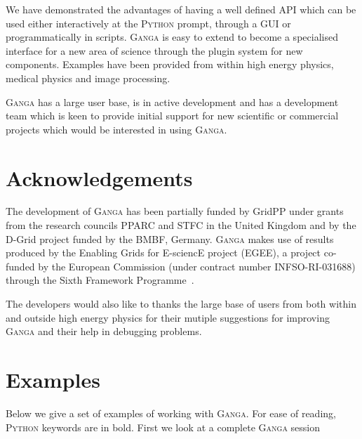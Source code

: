 \documentclass{elsart}
\def\ganga {\textsc{Ganga}\xspace}
\def\python {\textsc{Python}\xspace}
\begin{document}
We have demonstrated the advantages of having a well defined API which can be
used either interactively at the \python prompt, through a GUI or
programmatically in scripts. \ganga is easy to extend to become a specialised
interface for a new area of science through the plugin system for new
components. Examples have been provided  from within high
energy physics, medical physics and image processing.

\ganga has a large user base, is in active development and has a development
team which is keen to provide initial support for new scientific or commercial
projects which would be interested in using \ganga.

\section{Acknowledgements}
\label{sec:acknowledgements}
The development of \ganga has been partially funded by GridPP under
grants from the research councils PPARC and STFC in the United
Kingdom and by the D-Grid project funded by the BMBF, Germany.  
\ganga makes use of results produced by the Enabling Grids
for E-sciencE project (EGEE), a project co-funded by the European
Commission (under contract number INFSO-RI-031688) through the Sixth
Framework Programme~\cite{EGEE}.

The developers would also like to thanks the large base of users from both
within and outside high energy physics for their mutiple suggestions for
improving \ganga and their help in debugging problems.


\appendix

\section{Examples}
\label{sec:examples}
Below we give a set of examples of working with \ganga. For ease of reading,
\python keywords are in bold. First we look at a complete \ganga session
\vspace{-2ex}
\end{document}
